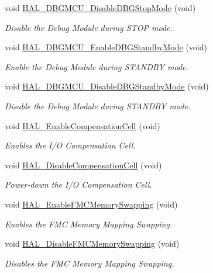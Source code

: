\begin{DoxyCompactItemize}
void \mbox{\hyperlink{group___h_a_l___exported___functions___group2_ga2c93dcee35e5983d74f1000de7c042d5}{H\+A\+L\+\_\+\+D\+B\+G\+M\+C\+U\+\_\+\+Disable\+D\+B\+G\+Stop\+Mode}} (void)
\begin{DoxyCompactList}\small\item\em Disable the Debug Module during S\+T\+OP mode. \end{DoxyCompactList}\item 
void \mbox{\hyperlink{group___h_a_l___exported___functions___group2_ga28a1323b2eeb0a408c1cfdbfa0db5ead}{H\+A\+L\+\_\+\+D\+B\+G\+M\+C\+U\+\_\+\+Enable\+D\+B\+G\+Standby\+Mode}} (void)
\begin{DoxyCompactList}\small\item\em Enable the Debug Module during S\+T\+A\+N\+D\+BY mode. \end{DoxyCompactList}\item 
void \mbox{\hyperlink{group___h_a_l___exported___functions___group2_ga7faa58d8508ea3123b9f247a70379779}{H\+A\+L\+\_\+\+D\+B\+G\+M\+C\+U\+\_\+\+Disable\+D\+B\+G\+Standby\+Mode}} (void)
\begin{DoxyCompactList}\small\item\em Disable the Debug Module during S\+T\+A\+N\+D\+BY mode. \end{DoxyCompactList}\item 
void \mbox{\hyperlink{group___h_a_l___exported___functions___group2_ga20b6ca07582e10aec5e15ad2fda7dfc1}{H\+A\+L\+\_\+\+Enable\+Compensation\+Cell}} (void)
\begin{DoxyCompactList}\small\item\em Enables the I/O Compensation Cell. \end{DoxyCompactList}\item 
void \mbox{\hyperlink{group___h_a_l___exported___functions___group2_ga653f1166b0e37afd40372550d806e667}{H\+A\+L\+\_\+\+Disable\+Compensation\+Cell}} (void)
\begin{DoxyCompactList}\small\item\em Power-\/down the I/O Compensation Cell. \end{DoxyCompactList}\item 
void \mbox{\hyperlink{group___h_a_l___exported___functions___group2_gac99ad862d5888a2672fdf7da1b8b25cd}{H\+A\+L\+\_\+\+Enable\+F\+M\+C\+Memory\+Swapping}} (void)
\begin{DoxyCompactList}\small\item\em Enables the F\+MC Memory Mapping Swapping. \end{DoxyCompactList}\item 
void \mbox{\hyperlink{group___h_a_l___exported___functions___group2_ga0863e6c3b386823ab0f5af6dd5121c32}{H\+A\+L\+\_\+\+Disable\+F\+M\+C\+Memory\+Swapping}} (void)
\begin{DoxyCompactList}\small\item\em Disables the F\+MC Memory Mapping Swapping. \end{DoxyCompactList}\end{DoxyCompactItemize}


